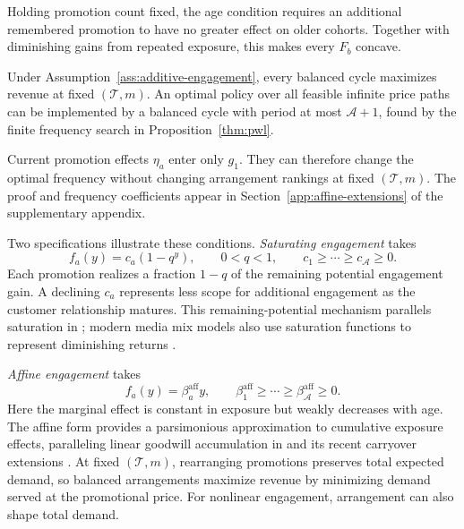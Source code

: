 \begingroup\color{black}
Holding promotion count fixed, the age condition requires an additional remembered promotion to have no greater effect on older cohorts. Together with diminishing gains from repeated exposure, this makes every \(F_b\) concave.
\par\endgroup

\begin{corollary}
\label{cor:affine-policy}
\begingroup\color{black}
Under Assumption~\ref{ass:additive-engagement}, every balanced cycle maximizes revenue at fixed \((\mathcal T,m)\). An optimal policy over all feasible infinite price paths can be implemented by a balanced cycle with period at most \(\mathcal A+1\), found by the finite frequency search in Proposition~\ref{thm:pwl}.
\par\endgroup
\end{corollary}

Current promotion effects \(\eta_a\) enter only \(g_1\). They can therefore change the optimal frequency without changing arrangement rankings at fixed \((\mathcal T,m)\). The proof and frequency coefficients appear in Section~\ref{app:affine-extensions} of the supplementary appendix.

Two specifications illustrate these conditions. \emph{Saturating engagement} takes
\[
 f_a(y)=c_a(1-q^y),
 \qquad 0<q<1,
 \qquad c_1\ge\cdots\ge c_{\mathcal A}\ge0.
\]
Each promotion realizes a fraction \(1-q\) of the remaining potential engagement gain. A declining \(c_a\) represents less scope for additional engagement as the customer relationship matures. This remaining-potential mechanism parallels saturation in \citet{vidalewolfe1957}; modern media mix models also use saturation functions to represent diminishing returns \citep{jin2017mmm}.

\emph{Affine engagement} takes
\[
 f_a(y)=\beta_a^{\mathrm{aff}}y,
 \qquad \beta_1^{\mathrm{aff}}\ge\cdots\ge
 \beta_{\mathcal A}^{\mathrm{aff}}\ge0.
\]
Here the marginal effect is constant in exposure but weakly decreases with age. The affine form provides a parsimonious approximation to cumulative exposure effects, paralleling linear goodwill accumulation in \citet{nerlovearrow1962} and its recent carryover extensions \citep{gozzi2024advertising}. At fixed \((\mathcal T,m)\), rearranging promotions preserves total expected demand, so balanced arrangements maximize revenue by minimizing demand served at the promotional price. For nonlinear engagement, arrangement can also shape total demand.

